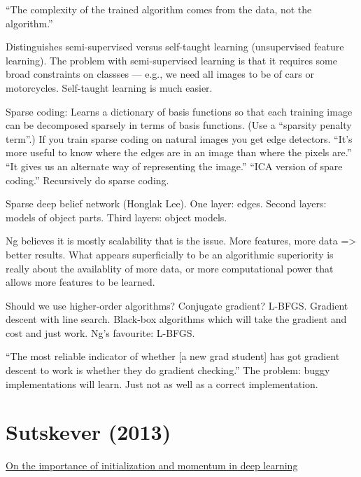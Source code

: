 \documentclass[12pt]{report}
\newcommand{\link}[2]{\href{#1}{#2}}
\begin{document}
``The complexity of the trained algorithm comes from the data, not the
algorithm.''

Distinguishes semi-supervised versus self-taught learning
(unsupervised feature learning).  The problem with semi-supervised
learning is that it requires some broad constraints on classses ---
e.g., we need all images to be of cars or motorcycles.  Self-taught
learning is much easier.

Sparse coding: Learns a dictionary of basis functions so that each
training image can be decomposed sparsely in terms of basis functions.
(Use a ``sparsity penalty term''.)  If you train sparse coding on
natural images you get edge detectors.  ``It's more useful to know
where the edges are in an image than where the pixels are.''  ``It
gives us an alternate way of representing the image.''  ``ICA version
of spare coding.''  Recursively do sparse coding.

Sparse deep belief network (Honglak Lee).  One layer: edges.  Second
layers: models of object parts.  Third layers: object models.  

Ng believes it is mostly scalability that is the issue.  More
features, more data => better results.  What appears superficially to
be an algorithmic superiority is really about the availablity of more
data, or more computational power that allows more features to be
learned.

Should we use higher-order algorithms?  Conjugate gradient?  L-BFGS.
Gradient descent with line search.  Black-box algorithms which will
take the gradient and cost and just work.  Ng's favourite: L-BFGS.

``The most reliable indicator of whether [a new grad student] has got
gradient descent to work is whether they do gradient checking.''  The
problem: buggy implementations will learn.  Just not as well as a
correct implementation.

\section{Sutskever (2013)}

\link{http://www.cs.utoronto.ca/\~ilya/pubs/2013/1051_2.pdf}{On the
  importance of initialization and momentum in deep learning}
\end{document}
